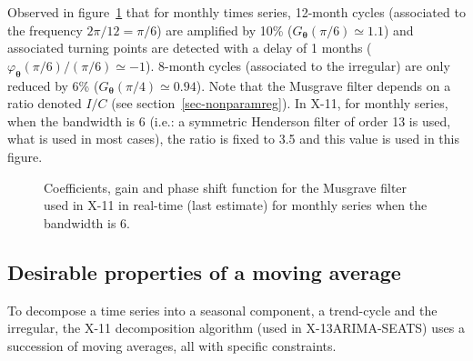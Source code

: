 \documentclass[
]{article}
\newcommand\1{\mathds{1}}
\begin{document}
Observed in figure~\ref{fig-graphsmusgrave} that for monthly times
series, 12-month cycles (associated to the frequency \(2\pi/12=\pi/6\))
are amplified by 10\% (\(G_{\boldsymbol\theta}(\pi/6)\simeq1.1\)) and
associated turning points are detected with a delay of 1 months
(\(\varphi_{\boldsymbol\theta}(\pi/6)/(\pi/6)\simeq -1\)). 8-month
cycles (associated to the irregular) are only reduced by 6\%
(\(G_{\boldsymbol\theta}(\pi/4)\simeq0.94\)). Note that the Musgrave
filter depends on a ratio denoted \(I/C\) (see
section~\ref{sec-nonparamreg}). In X-11, for monthly series, when the
bandwidth is 6 (i.e.: a symmetric Henderson filter of order 13 is used,
what is used in most cases), the ratio is fixed to 3.5 and this value is
used in this figure.

\begin{figure}[H]

\caption{\label{fig-graphsmusgrave}Coefficients, gain and phase shift
function for the Musgrave filter used in X-11 in real-time (last
estimate) for monthly series when the bandwidth is 6.}


\end{figure}%

\subsection{Desirable properties of a moving
average}\label{desirable-properties-of-a-moving-average}

To decompose a time series into a seasonal component, a trend-cycle and
the irregular, the X-11 decomposition algorithm (used in
X-13ARIMA-SEATS) uses a succession of moving averages, all with specific
constraints.
\end{document}
